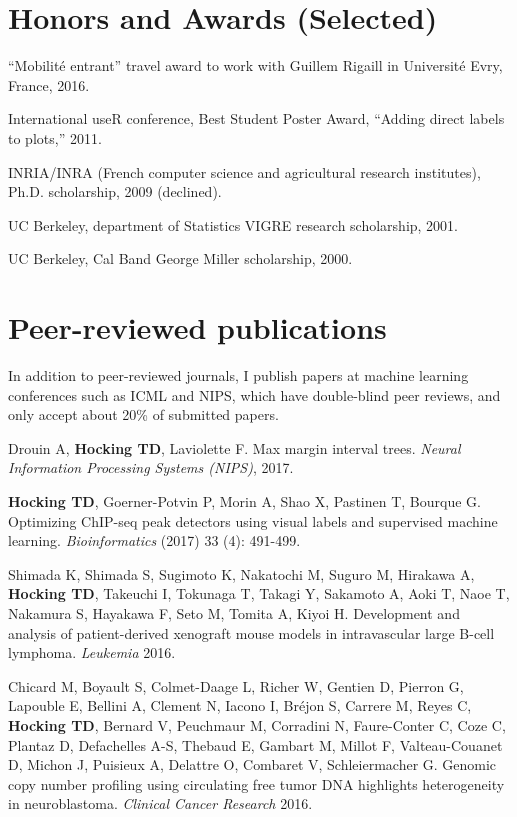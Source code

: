\documentclass[margin,line]{res}
\begin{document}
\begin{resume}
\section{\sc Honors and Awards (Selected)}

``Mobilit\'e entrant'' travel award to work with Guillem Rigaill in
Universit\'e Evry, France, 2016.

International useR conference, Best Student Poster Award, ``Adding
direct labels to plots,'' 2011.

INRIA/INRA (French computer science and agricultural research institutes), Ph.D. scholarship, 2009 (declined).

UC Berkeley, department of Statistics VIGRE research scholarship, 2001.

UC Berkeley, Cal Band George Miller scholarship, 2000.

\section{\sc Peer-reviewed publications}

In addition to peer-reviewed journals, I publish papers at
machine learning conferences such as ICML and NIPS, which have
double-blind peer reviews, and only accept about 20\% of submitted
papers.

Drouin A, {\bf Hocking TD}, Laviolette F. Max margin interval
trees. {\it Neural Information Processing Systems (NIPS)}, 2017.

{\bf Hocking TD}, Goerner-Potvin P, Morin A, Shao X, Pastinen T,
Bourque G. Optimizing ChIP-seq peak detectors using visual labels and
supervised machine learning. {\it Bioinformatics} (2017) 33 (4): 491-499.

Shimada K, Shimada S, Sugimoto K, Nakatochi M, Suguro M, Hirakawa A,
{\bf Hocking TD}, Takeuchi I, Tokunaga T, Takagi Y, Sakamoto A, Aoki T, Naoe
T, Nakamura S, Hayakawa F, Seto M, Tomita A, Kiyoi H. Development and
analysis of patient-derived xenograft mouse models in intravascular
large B-cell lymphoma. {\it Leukemia} 2016.

Chicard M, Boyault S, Colmet-Daage L, Richer W, Gentien D, Pierron G,
Lapouble E, Bellini A, Clement N, Iacono I, Bréjon S, Carrere M, Reyes
C, {\bf Hocking TD}, Bernard V, Peuchmaur M, Corradini N, Faure-Conter
C, Coze C, Plantaz D, Defachelles A-S, Thebaud E, Gambart M, Millot F,
Valteau-Couanet D, Michon J, Puisieux A, Delattre O, Combaret V,
Schleiermacher G. Genomic copy number profiling using circulating free
tumor DNA highlights heterogeneity in neuroblastoma. {\it Clinical Cancer
Research} 2016.


\end{resume}
\end{document}

